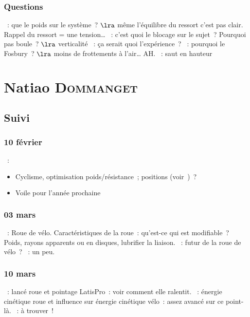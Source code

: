 \documentclass[a4paper, 11pt, final, garamond]{book}
\begin{document}
\subsection{Questions}
\begin{itemize}
  ~: que le poids sur le système~?
    $\lra$ même l'équilibre du ressort c'est pas clair. Rappel du ressort = une
    tension…
  ~: c'est quoi le blocage sur le sujet~? Pourquoi pas boule~?
    $\lra$ verticalité
  ~: ça serait quoi l'expérience~?
  ~: pourquoi le Fosbury~? $\lra$ moins de frottements à l'air…
  AH.
  ~: saut en hauteur
\end{itemize}

\chapter{Natiao \textsc{Dommanget}}
\label{ch:natiao}
\section{Suivi}
\subsection{10 février}
\begin{itemize}
    ~:
        \begin{itemize}
            \item Cyclisme, optimisation poids/résistance~; positions
                (voir~)~?
            \item Voile pour l'année prochaine
        \end{itemize}
\end{itemize}

\subsection{03 mars}
\begin{itemize}
    ~: Roue de vélo. Caractéristiques de la roue~: qu'est-ce qui est
        modifiable~? Poids, rayons apparents ou en disques, lubrifier la
        liaison.
    ~: futur de la roue de vélo~?
    ~: un peu.
\end{itemize}

\subsection{10 mars}
\begin{itemize}
    ~: lancé roue et pointage LatisPro~: voir comment elle ralentit.
    ~: énergie cinétique roue et influence sur énergie cinétique
        vélo~: assez avancé sur ce point-là.
    ~: à trouver~!
\end{itemize}
\end{document}
